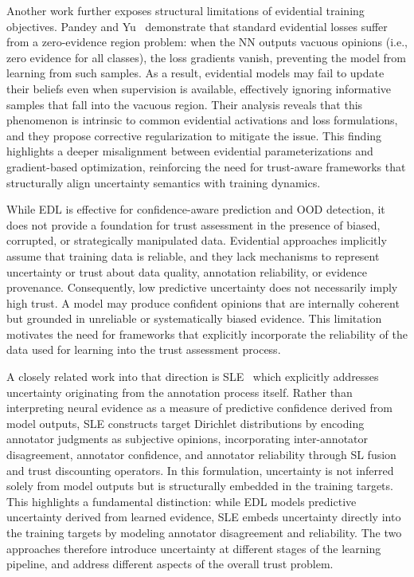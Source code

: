 Another work further exposes structural limitations of evidential training objectives. Pandey and Yu~\cite{pandey2023learnaccumulateevidencetraining} demonstrate that standard evidential losses suffer from a zero-evidence region problem: when the \ac{NN} outputs vacuous opinions (i.e., zero evidence for all classes), the loss gradients vanish, preventing the model from learning from such samples. As a result, evidential models may fail to update their beliefs even when supervision is available, effectively ignoring informative samples that fall into the vacuous region. Their analysis reveals that this phenomenon is intrinsic to common evidential activations and loss formulations, and they propose corrective regularization to mitigate the issue. This finding highlights a deeper misalignment between evidential parameterizations and gradient-based optimization, reinforcing the need for trust-aware frameworks that structurally align uncertainty semantics with training dynamics.

While \ac{EDL} is effective for confidence-aware prediction and \ac{OOD} detection, it does not provide a foundation for trust assessment in the presence of biased, corrupted, or strategically manipulated data. Evidential approaches implicitly assume that training data is reliable, and they lack mechanisms to represent uncertainty or trust about data quality, annotation reliability, or evidence provenance. Consequently, low predictive uncertainty does not necessarily imply high trust. A model may produce confident opinions that are internally coherent but grounded in unreliable or systematically biased evidence. This limitation motivates the need for frameworks that explicitly incorporate the reliability of the data used for learning into the trust assessment process.

A closely related work into that direction is \ac{SLE}~\cite{SLencodings} which explicitly addresses uncertainty originating from the annotation process itself. Rather than interpreting neural evidence as a measure of predictive confidence derived from model outputs, \ac{SLE} constructs target Dirichlet distributions by encoding annotator judgments as subjective opinions, incorporating inter-annotator disagreement, annotator confidence, and annotator reliability through \ac{SL} fusion and trust discounting operators. In this formulation, uncertainty is not inferred solely from model outputs but is structurally embedded in the training targets. This highlights a fundamental distinction: while \ac{EDL} models predictive uncertainty derived from learned evidence, \ac{SLE} embeds uncertainty directly into the training targets by modeling annotator disagreement and reliability. The two approaches therefore introduce uncertainty at different stages of the learning pipeline, and address different aspects of the overall trust problem.


